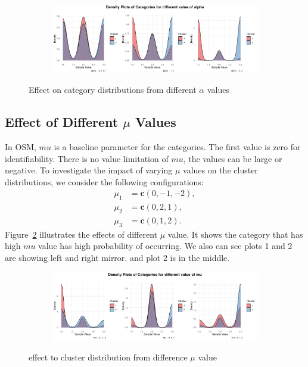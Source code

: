 \documentclass{article}
\begin{document}
\begin{figure}[htbp!]
  \centering
  \begin{subfigure}{1.0\textwidth}
      \centering
      \includegraphics[width=\textwidth]{images/para_sim/alpha.png}
  \end{subfigure}
  \caption{Effect on category distributions from different $\alpha$ values}
  \label{fig:alpha}
\end{figure}

\subsection{Effect of Different $\mu$ Values}
In OSM, $mu$ is a baseline parameter for the categories. 
The first value is zero for identifiability. There is no value limitation of $mu$, the values can be large or negative.
To investigate the impact of varying $\mu$ values on the cluster distributions, 
we consider the following configurations:
\[
\begin{aligned}
\mu_1 &= \mathbf{c}(0, -1, -2), \\
\mu_2 &= \mathbf{c}(0, 2, 1), \\
\mu_3 &= \mathbf{c}(0, 1, 2).
\end{aligned}
\]
Figure~\ref{fig:mu} illustrates the effects of different $\mu$ value.
It shows the category that has high $mu$ value has high probability of occurring.
We also can see plots 1 and 2 are showing left and right mirror. 
and plot 2 is in the middle.

\begin{figure}[htbp!]
  \centering
  \begin{subfigure}{1.0\textwidth}
      \centering
      \includegraphics[width=\textwidth]{images/para_sim/mu.png}
  \end{subfigure}
  \caption{effect to cluster distribution from difference $\mu$ value}
  \label{fig:mu}
\end{figure}
\end{document}
